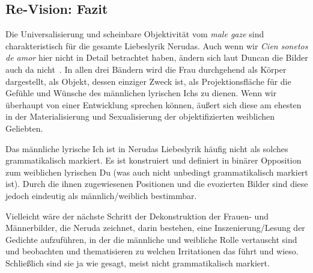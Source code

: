 \subsection{Re-Vision: Fazit}

Die Universalisierung und scheinbare Objektivität vom \textit{male gaze} sind charakteristisch für die gesamte Liebeslyrik Nerudas.
Auch wenn wir \textit{Cien sonetos de amor} hier nicht in Detail betrachtet haben, ändern sich laut Duncan die Bilder auch da nicht~\cite{Duncan1992}.
In allen drei Bändern wird die Frau durchgehend als Körper dargestellt, als Objekt, dessen einziger Zweck ist, als Projektionsfläche für die Gefühle und Wünsche des männlichen lyrischen Ichs zu dienen.
Wenn wir überhaupt von einer Entwicklung sprechen können, äußert sich diese am ehesten in der Materialisierung und Sexualisierung der objektifizierten weiblichen Geliebten.

Das männliche lyrische Ich ist in Nerudas Liebeslyrik häufig nicht als solches grammatikalisch markiert.
Es ist konstruiert und definiert in binärer Opposition zum weiblichen lyrischen Du (was auch nicht unbedingt grammatikalisch markiert ist).
Durch die ihnen zugewiesenen Positionen und die evozierten Bilder sind diese jedoch eindeutig als männlich/weiblich bestimmbar.

Vielleicht wäre der nächste Schritt der Dekonstruktion der Frauen- und Männerbilder, die Neruda zeichnet,
darin bestehen, eine Inszenierung/Lesung der Gedichte aufzuführen, in der die männliche und weibliche Rolle vertauscht sind und beobachten und thematisieren zu welchen Irritationen das führt und wieso.
Schließlich sind sie ja wie gesagt, meist nicht grammatikalisch markiert.
